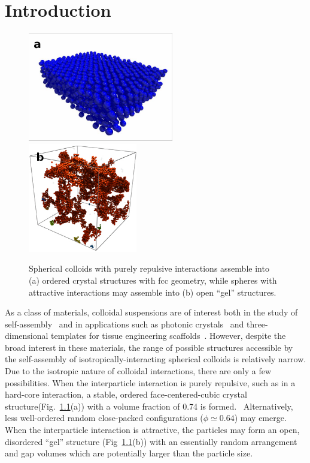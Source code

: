 \chapter{Introduction}

\begin{figure}
\begin{center}
\includegraphics[height=1.875in]{figures/literature-review/sphere-crystal.png}
\includegraphics[height=1.875in]{figures/literature-review/sphere-gel.png}
\end{center}
\caption{Spherical colloids with purely repulsive interactions assemble into (a) ordered 
crystal structures with fcc geometry, while spheres with
attractive interactions may assemble into (b) open ``gel'' structures.}

\label{fig:isotropic-structs}

\end{figure}

As a class of materials, colloidal suspensions are of interest both
in the study of self-assembly~\cite{glotzer-solomon} and in applications such
as photonic crystals~\cite{vos-photonic, yang-photonic} and three-dimensional templates for tissue 
engineering scaffolds~\cite{zhang-tissue}. However, despite the broad
interest in these materials, the range of possible 
structures accessible by the 
self-assembly of isotropically-interacting spherical colloids is relatively narrow.  Due to the isotropic nature
of colloidal interactions, there are only a few possibilities.
When the interparticle interaction is purely 
repulsive, such as in a hard-core interaction,  a stable, ordered face-centered-cubic crystal
structure(Fig.~\ref{fig:isotropic-structs}(a)) with a volume fraction of 0.74 is formed.~\cite{ise-crystal, wong-crystal}
Alternatively, less well-ordered random close-packed configurations ($\phi \simeq 0.64$) may emerge.
When the interparticle interaction is attractive, the particles may form an open, disordered ``gel'' 
structure (Fig~\ref{fig:isotropic-structs}(b)) 
with an essentially random arrangement and gap volumes which are potentially larger than the 
particle size.~\cite{warren-gel}

